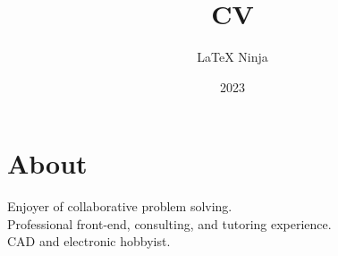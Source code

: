\documentclass[lighthipster]{simplehipstercv}
\title{CV}
\author{\LaTeX{} Ninja}
\date{2023}
\begin{document}
    
    
    \thispagestyle{empty}
    \vspace{5em}
    \small
    
    \begin{minipage}[t]{1\textwidth}
    \section*{About}
    Enjoyer of collaborative problem solving.\\
    Professional front-end, consulting, and tutoring experience.\\
    CAD and electronic hobbyist.
    \end{minipage}    
    \bigskip
\end{document}
